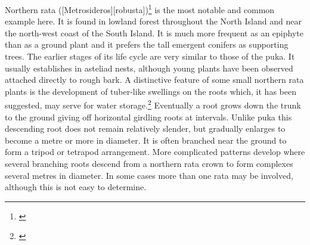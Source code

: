 Northern rata ([Metrosideros][robusta])\footnote{\cite{dawson1967growth}} is the most notable and common example here.
It is found in lowland forest throughout the North Island and near the north-west coast of the South Island.
It is much more frequent as an epiphyte than as a ground plant and it prefers the tall emergent conifers as supporting trees.
The earlier stages of its life cycle are very similar to those of the puka.
It usually establishes in asteliad nests, although young plants have been observed attached directly to rough bark.
A distinctive feature of some small northern rata plants is the development of tuber-like swellings on the roots which, it has been suggested, may serve for water storage.\footnote{\cite{beddie1953root}}
Eventually a root grows down the trunk to the ground giving off horizontal girdling roots at intervals.
Unlike puka this descending root does not remain relatively slender, but gradually enlarges to become a metre or more in diameter.
It is often branched near the ground to form a tripod or tetrapod arrangement.
More complicated patterns develop where several branching roots descend from a northern rata crown to form complexes several metres in diameter.
In some cases more than one rata may be involved, although this is not easy to determine.

